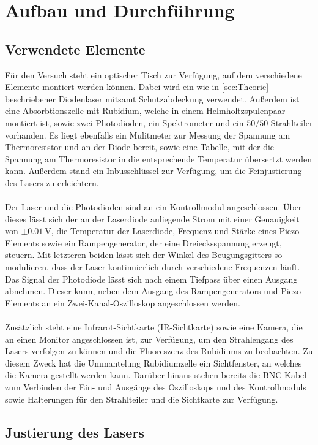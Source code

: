 \section{Aufbau und Durchführung}
\subsection{Verwendete Elemente}
Für den Versuch steht ein optischer Tisch zur Verfügung, auf dem verschiedene Elemente montiert werden können. Dabei wird ein wie in \autoref{sec:Theorie} beschriebener Diodenlaser mitsamt Schutzabdeckung verwendet.
Außerdem ist eine Absorbtionszelle mit Rubidium, welche in einem Helmholtzspulenpaar montiert ist, sowie zwei Photodioden, ein Spektrometer und ein $50/50$-Strahlteiler vorhanden. Es liegt ebenfalls ein Mulitmeter zur 
Messung der Spannung am Thermoresistor und an der Diode bereit, sowie eine Tabelle, mit der die Spannung am Thermoresistor in die entsprechende Temperatur übersertzt werden kann. Außerdem stand ein Inbusschlüssel 
zur Verfügung, um die Feinjustierung des Lasers zu erleichtern.\\
\\
Der Laser 
und die Photodioden sind an ein Kontrollmodul angeschlossen. Über dieses lässt sich der an der Laserdiode anliegende Strom mit einer Genauigkeit von $\pm\qty{0.01}{\volt}$, 
die Temperatur der Laserdiode, Frequenz und Stärke eines Piezo-Elements
sowie ein Rampengenerator, der eine Dreiecksspannung erzeugt, steuern. Mit letzteren beiden lässt sich der Winkel des Beugungsgitters so modulieren, dass der Laser kontinuierlich durch verschiedene Frequenzen läuft. Das Signal der Photodiode
lässt sich nach einem Tiefpass über einen Ausgang abnehmen. Dieser kann, neben dem Ausgang des Rampengenerators und Piezo-Elements an ein Zwei-Kanal-Oszilloskop angeschlossen werden. \\
\\
Zusätzlich
steht eine Infrarot-Sichtkarte (IR-Sichtkarte) sowie eine Kamera, die an einen Monitor angeschlossen ist, zur Verfügung, um den Strahlengang des Lasers verfolgen zu können und die Fluoreszenz des Rubidiums zu beobachten.
Zu diesem Zweck hat die Ummantelung Rubidiumzelle ein Sichtfenster, an welches die Kamera gestellt werden kann. Darüber hinaus 
stehen bereits die BNC-Kabel zum Verbinden der Ein- und Ausgänge des Oszilloskops und des Kontrollmoduls sowie Halterungen für den Strahlteiler und die Sichtkarte zur Verfügung.

\subsection{Justierung des Lasers}

